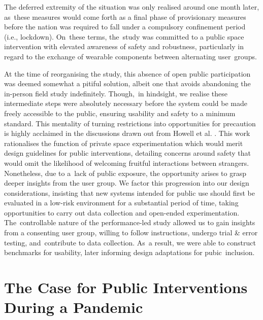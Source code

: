 The deferred extremity of the situation was only realised around one month later, as~these measures would come forth as a final phase of provisionary measures before the nation was required to fall under a compulsory confinement period (i.e., lockdown). On~these terms, the~study was committed to a public space intervention with elevated awareness of safety and robustness, particularly in regard to the exchange of wearable components between alternating user~groups.

At the time of reorganising the study, this absence of open public participation was deemed somewhat a pitiful solution, albeit one that avoids abandoning the in-person field study indefinitely. Though,~in hindsight, we realise these intermediate steps were absolutely necessary before the system could be made freely accessible to the public, ensuring usability and safety to a minimum standard. This mentality of turning restrictions into opportunities for precaution is highly acclaimed in the discussions drawn out from  Howell et al. %
\cite{howell_life-affirming_2019}. This work rationalises the function of private space experimentation which would merit design guidelines for public interventions, detailing concerns around safety that would omit the likelihood of welcoming fruitful interactions between strangers. Nonetheless, due to a~lack of public exposure, the opportunity arises to grasp deeper insights from the user group. We factor this progression into our design considerations, insisting that new systems intended for public use should first be evaluated in a low-risk environment for a substantial period of time, taking opportunities to carry out data collection and open-ended experimentation. The~controllable nature of the performance-led study allowed us to gain insights from a consenting user group, willing to follow instructions, undergo trial \& error testing, and~contribute to data collection. As~a result, we were able to construct benchmarks for usability, later informing design adaptations for pubic~inclusion.

\section{The Case for Public Interventions During a Pandemic}
\label{sec:public_adaptation}

